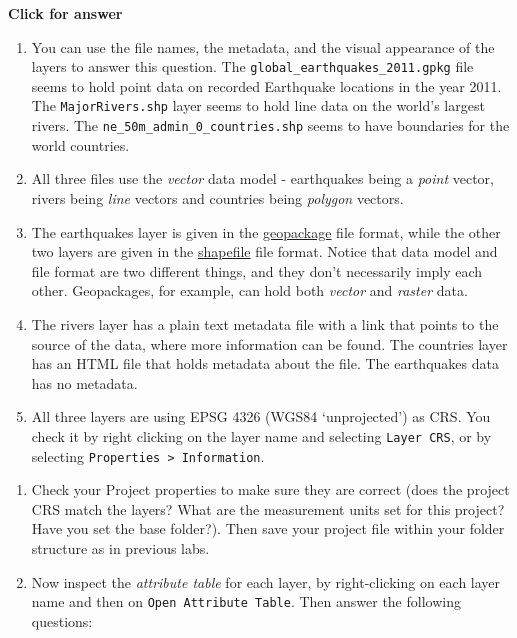 \documentclass[
  letterpaper,
  DIV=11,
  numbers=noendperiod]{scrreprt}
\begin{document}
\begin{tcolorbox}[enhanced jigsaw, leftrule=.75mm, colframe=quarto-callout-important-color-frame, breakable, toprule=.15mm, bottomrule=.15mm, arc=.35mm, rightrule=.15mm, opacityback=0, colback=white, left=2mm]

\vspace{-3mm}\textbf{Click for answer}\vspace{3mm}

\begin{enumerate}
\def\labelenumi{\alph{enumi})}
\item
  You can use the file names, the metadata, and the visual appearance of
  the layers to answer this question. The
  \texttt{global\_earthquakes\_2011.gpkg} file seems to hold point data
  on recorded Earthquake locations in the year 2011. The
  \texttt{MajorRivers.shp} layer seems to hold line data on the world's
  largest rivers. The \texttt{ne\_50m\_admin\_0\_countries.shp} seems to
  have boundaries for the world countries.
\item
  All three files use the \emph{vector} data model - earthquakes being a
  \emph{point} vector, rivers being \emph{line} vectors and countries
  being \emph{polygon} vectors.
\item
  The earthquakes layer is given in the
  \href{https://www.geopackage.org/}{geopackage} file format, while the
  other two layers are given in the
  \href{https://doc.arcgis.com/en/arcgis-online/reference/shapefiles.htm}{shapefile}
  file format. Notice that data model and file format are two different
  things, and they don't necessarily imply each other. Geopackages, for
  example, can hold both \emph{vector} and \emph{raster} data.
\item
  The rivers layer has a plain text metadata file with a link that
  points to the source of the data, where more information can be found.
  The countries layer has an HTML file that holds metadata about the
  file. The earthquakes data has no metadata.
\item
  All three layers are using EPSG 4326 (WGS84 `unprojected') as CRS. You
  check it by right clicking on the layer name and selecting
  \texttt{Layer\ CRS}, or by selecting
  \texttt{Properties\ \textgreater{}\ Information}.
\end{enumerate}

\end{tcolorbox}

\begin{enumerate}
\def\labelenumi{(\arabic{enumi})}
\setcounter{enumi}{70}
\item
  Check your Project properties to make sure they are correct (does the
  project CRS match the layers? What are the measurement units set for
  this project? Have you set the base folder?). Then save your project
  file within your folder structure as in previous labs.
\item
  Now inspect the \emph{attribute table} for each layer, by
  right-clicking on each layer name and then on
  \texttt{Open\ Attribute\ Table}. Then answer the following questions:
\end{enumerate}
\end{document}
